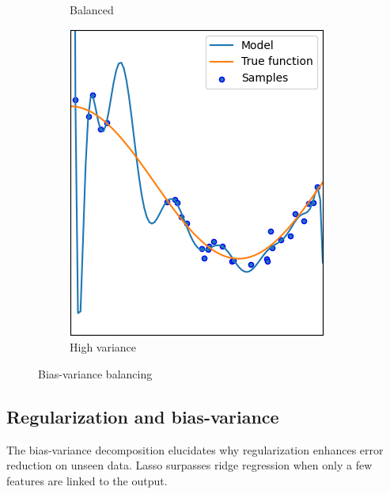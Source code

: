 \begin{figure}[H]
\begin{subfigure}{0.32\textwidth}
        \caption{Balanced}
    \end{subfigure}
    \begin{subfigure}{0.32\textwidth}
        \centering
        \includegraphics[width=0.75\linewidth]{images/hv.png} 
        \caption{High variance}
    \end{subfigure}
    \caption{Bias-variance balancing}
\end{figure}

\subsection{Regularization and bias-variance}
The bias-variance decomposition elucidates why regularization enhances error reduction on unseen data. 
Lasso surpasses ridge regression when only a few features are linked to the output.